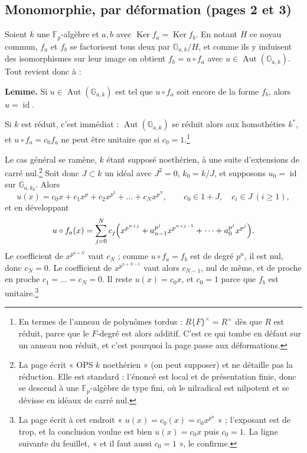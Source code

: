 \documentclass[11pt,a4paper]{article}
\begin{document}
\subsection*{Monomorphie, par déformation (pages 2 et 3)}

Soient $k$ une $\mathbb{F}_p$-algèbre et $a, b$ avec
$\operatorname{Ker} f_a = \operatorname{Ker} f_b$. En notant $H$ ce noyau
commun, $f_a$ et $f_b$ se factorisent tous deux par $\mathbb{G}_{a,k}/H$, et
comme ils y induisent des isomorphismes sur leur image on obtient
$f_b = u \circ f_a$ avec $u \in \operatorname{Aut}(\mathbb{G}_{a,k})$. Tout
revient donc à :

\textbf{Lemme.} Si $u \in \operatorname{Aut}(\mathbb{G}_{a,k})$ est tel que
$u \circ f_a$ soit encore de la forme $f_b$, alors
$u = \operatorname{id}$.

Si $k$ est réduit, c'est immédiat : $\operatorname{Aut}(\mathbb{G}_{a,k})$
se réduit alors aux homothéties $k^*$, et
$u \circ f_a = c_0 f_a$ ne peut être unitaire que si $c_0 = 1$.\footnote{En
termes de l'anneau de polynômes tordus : $R\{F\}^\times = R^\times$ dès que
$R$ est réduit, parce que le $F$-degré est alors additif. C'est ce
qui tombe en défaut sur un anneau non réduit, et c'est pourquoi la page passe
aux déformations.}

Le cas général se ramène, $k$ étant supposé noethérien, à une suite
d'extensions de carré nul.\footnote{La page écrit « OPS $k$ noethérien »
(on peut supposer) et ne détaille pas la réduction. Elle est standard :
l'énoncé est local et de présentation finie, donc se descend à une
$\mathbb{F}_p$-algèbre de type fini, où le nilradical est nilpotent et se
dévisse en idéaux de carré nul.} Soit donc $J \subset k$ un idéal avec
$J^2 = 0$, $k_0 = k/J$, et supposons $u_0 = \operatorname{id}$ sur
$\mathbb{G}_{a,k_0}$. Alors
\[
  u(x) = c_0 x + c_1 x^p + c_2 x^{p^2} + \dots + c_N x^{p^N},
  \qquad c_0 \in 1 + J, \quad c_i \in J \ (i \geqslant 1) ,
\]
et en développant
\[
  u \circ f_a(x) = \sum_{j=0}^{N} c_j
  \Bigl(x^{p^{n+j}} + a_{n-1}^{p^j} x^{p^{n+j-1}} + \dots
  + a_0^{p^j} x^{p^j}\Bigr).
\]
Le coefficient de $x^{p^{n+N}}$ vaut $c_N$ ; comme $u \circ f_a = f_b$ est de
degré $p^n$, il est nul, donc $c_N = 0$. Le coefficient de $x^{p^{n+N-1}}$
vaut alors $c_{N-1}$, nul de même, et de proche en proche
$c_1 = \dots = c_N = 0$. Il reste $u(x) = c_0 x$, et $c_0 = 1$ parce que
$f_b$ est unitaire.\footnote{La page écrit à cet endroit
« $u(x) = c_0(x) = c_0 x^{p^n}$ » ; l'exposant est de trop, et la
conclusion voulue est bien $u(x) = c_0 x$ puis $c_0 = 1$. La ligne suivante
du feuillet, « et il faut aussi $c_0 = 1$ », le confirme.}
\end{document}
